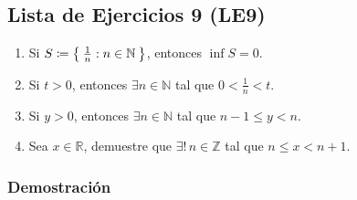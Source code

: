 \documentclass[11pt]{article}
\newcommand{\N}{\mathbb{N}}
\newcommand{\Z}{\mathbb{Z}}
\newcommand{\R}{\mathbb{R}}
\let\set\Set
\begin{document}
\subsection*{Lista de Ejercicios 9 (LE9)}

\begin{enumerate}[label=\alph*)]
 \item Si $S \coloneqq \set{\frac{1}{n}: n\in \N}$, entonces $\inf{S=0}$.
 \item Si $t>0$, entonces $\exists n\in \N$ tal que $0<\frac{1}{n}<t$.
 \item Si $y>0$, entonces $\exists n\in \N$ tal que $n-1\leq y< n$.
 \item Sea $x\in \R$, demuestre que $\exists! \, n\in \Z$ tal que $n\leq x<n+1$.
\end{enumerate}

\subsubsection*{Demostración}
\end{document}
